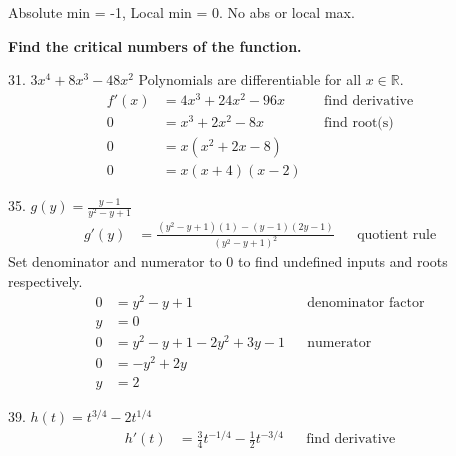 \documentclass{article}
\begin{document}
\begin{description}
          Absolute min = -1, Local min = 0. No abs or local max.
    \item\textbf{Find the critical numbers of the function.}
          \begin{description}
              \setlength\itemsep{3em}
              \item 31. $3x^4 + 8x^3-48x^2$
                    Polynomials are differentiable for all  $x \in \mathbb{R}$.
                    \begin{align*}
                        f'(x) & = 4x^3 + 24x^2-96x &  & \text{find derivative} \\
                        0     & = x^3 + 2x^2 - 8x  &  & \text{find root(s)}    \\
                        0     & = x(x^2 +2x - 8)                               \\
                        0     & = x(x + 4)(x-2)
                    \end{align*}
              \item 35. $g(y) = \frac{y-1}{y^2 - y + 1}$
                    \begin{align*}
                        g'(y) & = \frac{(y^2 - y + 1)(1) - (y-1)(2y-1)}{{(y^2 - y + 1)}^2} &  & \text{quotient rule}
                    \end{align*}
                    Set denominator and numerator to 0 to find undefined inputs and roots respectively.
                    \begin{align*}
                        0 & = y^2 - y + 1                 &  & \text{denominator factor} \\
                        y & = 0                                                          \\[2em]
                        0 & = y^2 - y + 1 - 2y^2 + 3y - 1 &  & \text{numerator}          \\
                        0 & = -y^2 + 2y                                                  \\
                        y & = 2
                    \end{align*}
              \item 39. $h(t) = t^{3/4} - 2t^{1/4}$
                    \begin{align*}
                        h'(t) & = \frac{3}{4}t^{-1/4} - \frac{1}{2}t^{-3/4}                                               &  & \text{find derivative}         \\[1em]

\end{align*}
\end{description}
\end{description}
\end{document}
